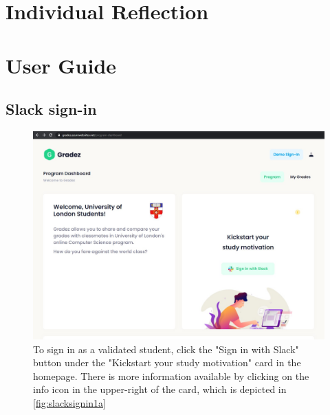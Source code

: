 \section{Individual Reflection}


\newpage

 


\appendix
\appendixpage
\addappheadtotoc

\section{User Guide}\label{sec:guide}

\subsection{Slack sign-in}\label{sec:slacksignin}
\begin{figure}[H]
    \centering
    \includegraphics[width=15cm]{images/user-guide/slack-sign-in/1.jpg}
    \caption{To sign in as a validated student, click the "Sign in with Slack" button under the "Kickstart your study motivation" card in the homepage. There is more information available by clicking on the info icon in the upper-right of the card, which is depicted in \cref{fig:slacksignin1a}}
    \label{fig:slacksignin1}
\end{figure}
